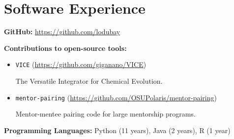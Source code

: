 \section*{Software Experience}


\noindent
{\bf GitHub:} \url{https://github.com/lodubay}

\vspace{6pt}
\noindent
{\bf Contributions to open-source tools:}

\begin{itemize}
\item {\tt VICE} (\url{https://github.com/giganano/VICE})

The Versatile Integrator for Chemical Evolution.

\item {\tt mentor-pairing} (\url{https://github.com/OSUPolaris/mentor-pairing})

Mentor-mentee pairing code for large mentorship programs.
\end{itemize}

\vspace{6pt}
\noindent
{\bf Programming Languages:} Python (11 years), Java (2 years), R (1 year)